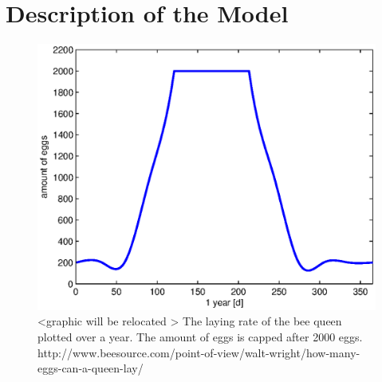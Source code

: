 \section{Description of the Model}

\begin{figure}
  \centering
    \includegraphics{data/egg_plot.eps}
    \caption{<graphic will be relocated > The laying rate of the bee queen plotted over a year. The amount of eggs is capped after 2000 eggs.  http://www.beesource.com/point-of-view/walt-wright/how-many-eggs-can-a-queen-lay/}
\end{figure}

